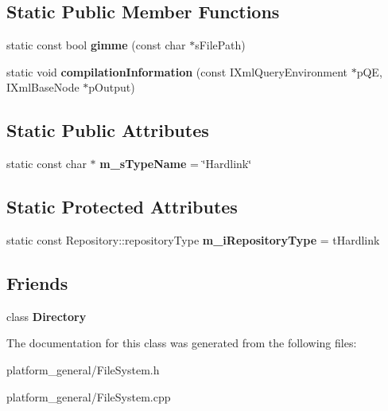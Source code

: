 \subsection*{\-Static \-Public \-Member \-Functions}
\begin{DoxyCompactItemize}
\item 
\hypertarget{classgeneral__server_1_1Hardlink_a836c5b7a84dad7602c6bfda78e106362}{static const bool {\bfseries gimme} (const char $\ast$s\-File\-Path)}\label{classgeneral__server_1_1Hardlink_a836c5b7a84dad7602c6bfda78e106362}

\item 
\hypertarget{classgeneral__server_1_1Hardlink_a6d24c2209e3c88a5be3fc322412b6b30}{static void {\bfseries compilation\-Information} (const \-I\-Xml\-Query\-Environment $\ast$p\-Q\-E, \-I\-Xml\-Base\-Node $\ast$p\-Output)}\label{classgeneral__server_1_1Hardlink_a6d24c2209e3c88a5be3fc322412b6b30}

\end{DoxyCompactItemize}
\subsection*{\-Static \-Public \-Attributes}
\begin{DoxyCompactItemize}
\item 
\hypertarget{classgeneral__server_1_1Hardlink_ae96633fbfc933f542dc5a573a18ebf82}{static const char $\ast$ {\bfseries m\-\_\-s\-Type\-Name} = \char`\"{}\-Hardlink\char`\"{}}\label{classgeneral__server_1_1Hardlink_ae96633fbfc933f542dc5a573a18ebf82}

\end{DoxyCompactItemize}
\subsection*{\-Static \-Protected \-Attributes}
\begin{DoxyCompactItemize}
\item 
\hypertarget{classgeneral__server_1_1Hardlink_a70b34f078d08bb4edc8005be627ee5aa}{static const \*
\-Repository\-::repository\-Type {\bfseries m\-\_\-i\-Repository\-Type} = t\-Hardlink}\label{classgeneral__server_1_1Hardlink_a70b34f078d08bb4edc8005be627ee5aa}

\end{DoxyCompactItemize}
\subsection*{\-Friends}
\begin{DoxyCompactItemize}
\item 
\hypertarget{classgeneral__server_1_1Hardlink_a245303e8660be5fb8eb2828a8c44b773}{class {\bfseries \-Directory}}\label{classgeneral__server_1_1Hardlink_a245303e8660be5fb8eb2828a8c44b773}

\end{DoxyCompactItemize}


\-The documentation for this class was generated from the following files\-:\begin{DoxyCompactItemize}
\item 
platform\-\_\-general/\-File\-System.\-h\item 
platform\-\_\-general/\-File\-System.\-cpp\end{DoxyCompactItemize}
